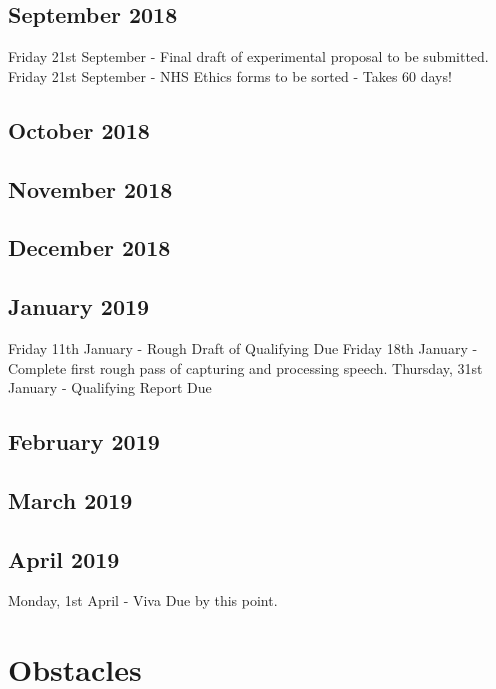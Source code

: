 \documentclass[a4paper]{article}
\begin{document}
	
	\subsection{September 2018}
	Friday 21st September - Final draft of experimental proposal to be submitted. 
	Friday 21st September - NHS Ethics forms to be sorted  - Takes 60 days!
	\subsection{October 2018}

	\subsection{November 2018}
	
	\subsection{December 2018}	
	
	\subsection{January 2019}
	Friday 11th January - Rough Draft of Qualifying Due
	Friday 18th January - Complete first rough pass of capturing and processing speech.
	Thursday, 31st January - Qualifying Report Due
	
	\subsection{February 2019}

	
	\subsection{March 2019}
	
	\subsection{April 2019}
	Monday, 1st April - Viva Due by this point.
\section{Obstacles}
\end{document}
